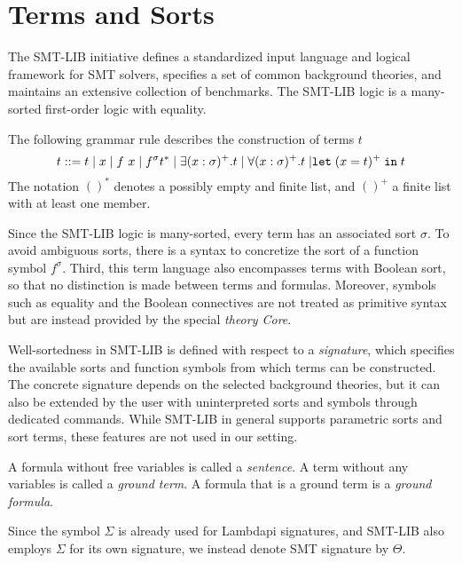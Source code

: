 \section{Terms and Sorts}

The SMT-LIB initiative \cite{smtlib} defines a standardized input language and logical framework for SMT solvers, specifies a set of common background theories, and maintains an extensive collection of benchmarks.
The SMT-LIB logic is a many-sorted first-order logic with equality.

\begin{definition}[Terms]\label{def:smt-grammar}
The following grammar rule describes the construction of terms $t$
\begin{equation*}
t ::= t \mathrel{|} x \mathrel{|} f~x \mathrel{|} f^\sigma t^* \mathrel{|} \exists (x: \sigma)^+. t \mathrel{|} \forall (x: \sigma)^+. t \mathrel{|} \mathrel{\texttt{\upshape{let}}} (x = t)^+ \mathrel{\texttt{\upshape{in}}} t
\end{equation*}
The notation $()^*$ denotes a possibly empty and finite list, and $()^+$ a finite list with at least one member.
\end{definition}

Since the SMT-LIB logic is many-sorted, every term has an associated sort $\sigma$.
To avoid ambiguous sorts, there is a syntax to concretize the sort of a function symbol $f^\sigma$.
Third, this term language also encompasses terms with Boolean sort, so that no distinction is made between terms and formulas.
Moreover, symbols such as equality and the Boolean connectives are not treated as primitive syntax but are instead provided by the special \emph{theory Core}.

Well-sortedness in SMT-LIB is defined with respect to a \emph{signature}, which specifies the available sorts and function symbols from which terms can be constructed.
The concrete signature depends on the selected background theories, but it can also be extended by the user with uninterpreted sorts and symbols through dedicated commands.
While SMT-LIB in general supports parametric sorts and sort terms, these features are not used in our setting.


A formula without free variables is called a \emph{sentence}.
A term without any variables is called a \emph{ground term}. A formula that is a ground term is a \emph{ground formula}.

\begin{notation}
Since the symbol $\Sigma$ is already used for Lambdapi signatures, and SMT-LIB also employs $\Sigma$ for its own signature, we instead denote SMT signature by $\Theta$.  
\end{notation}

